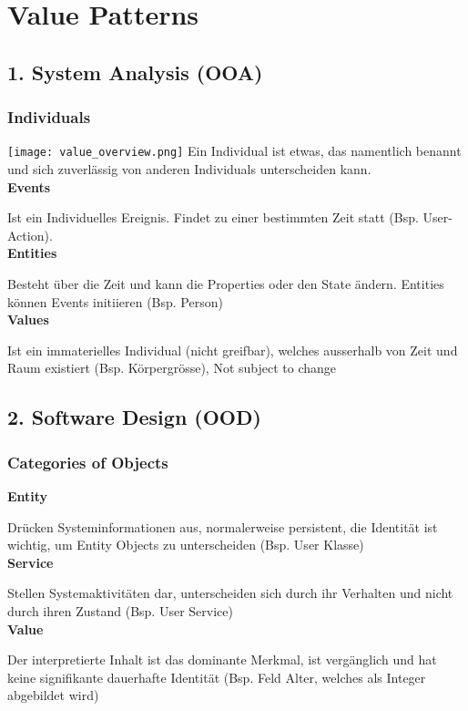 \section{Value Patterns}
\subsection{1. System Analysis (OOA)}
\subsubsection{Individuals}
\texttt{[image: value\_overview.png]}
Ein Individual ist etwas, das namentlich benannt und sich zuverlässig von anderen
Individuals unterscheiden kann. \\

\textbf{Events}

Ist ein Individuelles Ereignis. Findet zu einer bestimmten Zeit statt (Bsp. User-Action). \\

\textbf{Entities}

Besteht über die Zeit und kann die Properties oder den State ändern. Entities können Events initiieren (Bsp. Person) \\

\textbf{Values}

Ist ein immaterielles Individual (nicht greifbar), welches ausserhalb von Zeit und Raum existiert (Bsp. Körpergrösse), Not subject to change

\subsection{2. Software Design (OOD)}
\subsubsection{Categories of Objects}
\textbf{Entity}

Drücken Systeminformationen aus, normalerweise persistent, die Identität ist wichtig, um Entity Objects zu unterscheiden (Bsp. User Klasse)\\

\textbf{Service}

Stellen Systemaktivitäten dar, unterscheiden sich durch ihr Verhalten und nicht durch ihren Zustand (Bsp. User Service) \\

\textbf{Value}

Der interpretierte Inhalt ist das dominante Merkmal, ist vergänglich und hat keine signifikante dauerhafte Identität (Bsp. Feld Alter, welches als Integer abgebildet wird) \\

